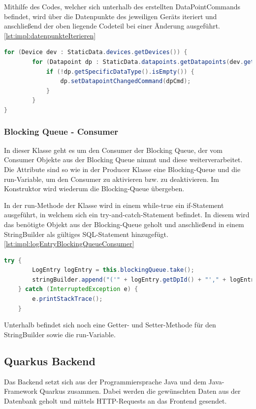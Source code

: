  
Mithilfe des Codes, welcher sich unterhalb des erstellten DataPointCommands befindet, wird über die Datenpunkte des jeweiligen Geräts iteriert und anschließend der oben liegende Codeteil bei einer Änderung ausgeführt. \ref{lst:impl:datenpunkteIterieren}
 
\begin{lstlisting}[language=java,caption=Datenpunkte des jeweiligen Geräts iterieren,label=lst:impl:datenpunkteIterieren]
    for (Device dev : StaticData.devices.getDevices()) {
        for (Datapoint dp : StaticData.datapoints.getDatapoints(dev.getId())) {
            if (!dp.getSpecificDataType().isEmpty()) {
                dp.setDatapointChangedCommand(dpCmd);
            }
        }
}
\end{lstlisting}

\subsubsection{Blocking Queue - Consumer }
In dieser Klasse geht es um den Consumer der Blocking Queue, der vom Consumer Objekte aus der Blocking Queue nimmt und diese weiterverarbeitet. Die Attribute sind so wie in der Producer Klasse eine Blocking-Queue und die run-Variable, um den Consumer zu aktivieren bzw. zu deaktivieren. Im Konstruktor wird wiederum die Blocking-Queue übergeben.
 
In der run-Methode der Klasse wird in einem while-true ein if-Statement ausgeführt, in welchem sich ein try-and-catch-Statement befindet. In diesem wird das benötigte Objekt aus der Blocking-Queue geholt und anschließend in einem StringBuilder als gültiges SQL-Statement hinzugefügt. \ref{lst:impl:logEntryBlockingQueueConsumer}

 \begin{lstlisting}[language=java,caption=Daten aus BlockingQueue herausnehmen,label=lst:impl:logEntryBlockingQueueConsumer]
    try {
        LogEntry logEntry = this.blockingQueue.take();
        stringBuilder.append("('" + logEntry.getDpId() + "'," + logEntry.getValue() + "," + "'A'," + logEntry.getTimeStamp() + "),");
    } catch (InterruptedException e) {
        e.printStackTrace();
    }
\end{lstlisting}

Unterhalb befindet sich noch eine Getter- und Setter-Methode für den StringBuilder sowie die run-Variable.
 
\subsection{Quarkus Backend}
Das Backend setzt sich aus der Programmiersprache Java und dem Java-Framework Quarkus zusammen. Dabei werden die gewünschten Daten aus der Datenbank geholt und mittels HTTP-Requests an das Frontend gesendet.
 
